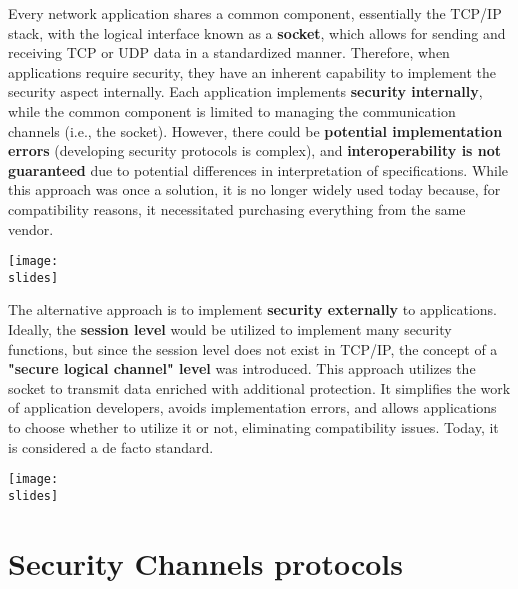 \vspace*{5mm}
\noindent
\begin{minipage}{0.65\textwidth}
    Every network application shares a common component, essentially the TCP/IP stack, with the logical interface known as a \textbf{socket}, which allows for sending and receiving TCP or UDP data in a standardized manner. Therefore, when applications require security, they have an inherent capability to implement the security aspect internally. Each application implements \textbf{security internally}, while the common component is limited to managing the communication channels
    (i.e., the socket). However, there could be \textbf{potential implementation errors} (developing security protocols is complex), and \textbf{interoperability is not guaranteed} due to potential differences in interpretation of specifications. While this approach was once a solution, it is no longer widely used today because, for compatibility reasons, it necessitated purchasing everything from the same vendor.
\end{minipage}
\hspace{0.05\textwidth}
\begin{minipage}{0.3\textwidth}
    \centering
    \texttt{[image: \\slides]}
\end{minipage}


\noindent
\begin{minipage}{0.65\textwidth}
    The alternative approach is to implement \textbf{security externally} to applications. Ideally, the \textbf{session level} would be utilized to implement many security functions, but since the session level does not exist in TCP/IP, the concept of a \textbf{"secure logical channel" level} was introduced. This approach utilizes the socket to transmit data enriched with additional protection. It simplifies the work of application developers, avoids implementation errors, and allows applications to choose whether to utilize it or not, eliminating compatibility issues. Today, it is considered a de facto standard.
\end{minipage}
\hspace{0.05\textwidth}
\begin{minipage}{0.3\textwidth}
    \centering
    \texttt{[image: \\slides]}
\end{minipage}


\section{Security Channels protocols}

